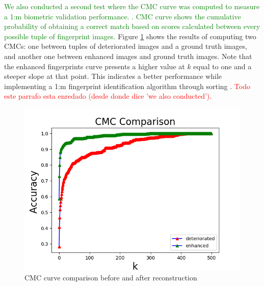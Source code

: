 \documentclass[a4paper,fleqn]{cas-dc}
\begin{document}
\textcolor{green}{We also conducted a second test where the CMC curve was computed to measure a 1:m biometric validation performance. \cite{RROCCMC}. CMC curve shows the cumulative probability of obtaining a correct match based on scores calculated between every possible tuple of fingerprint images.} Figure \ref{fig10} shows the results of computing two CMCs: one between tuples of deteriorated images and a ground truth images, and another one between enhanced images and ground truth images. Note that the enhanced fingerprints curve presents a higher value at $k$ equal to one and a steeper slope at that point. This indicates a better performance while implementing a 1:m fingerprint identification algorithm through sorting \cite{RROCCMC}. \textcolor{red}{Todo este parrafo esta enredado (desde donde dice 'we also conducted').}
\begin{figure}[htbp]
\centerline{\includegraphics[scale=0.5]{figs/cmc_comparison.png}}
\caption{CMC curve comparison before and after reconstruction}
\label{fig10}
\end{figure}
\end{document}
